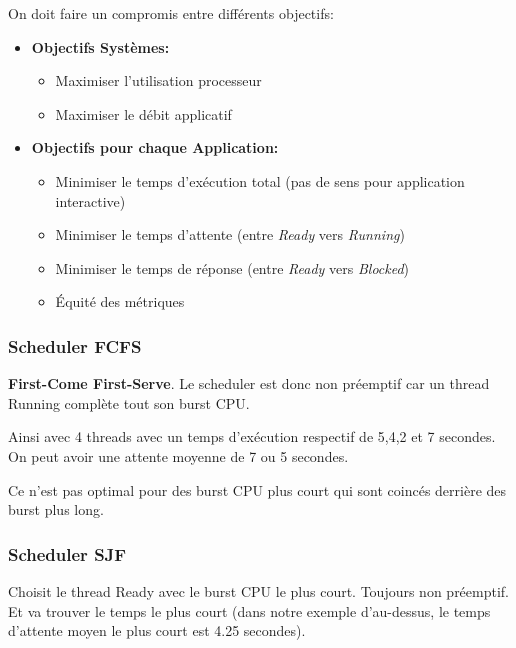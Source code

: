 On doit faire un compromis entre différents objectifs:

\begin{itemize}
\tightlist
\item
  \textbf{Objectifs Systèmes:}

  \begin{itemize}
  \tightlist
  \item
    Maximiser l'utilisation processeur
  \item
    Maximiser le débit applicatif
  \end{itemize}
\item
  \textbf{Objectifs pour chaque Application:}

  \begin{itemize}
  \tightlist
  \item
    Minimiser le temps d'exécution total (pas de sens pour application
    interactive)
  \item
    Minimiser le temps d'attente (entre \emph{Ready} vers
    \emph{Running})
  \item
    Minimiser le temps de réponse (entre \emph{Ready} vers
    \emph{Blocked})
  \item
    Équité des métriques
  \end{itemize}
\end{itemize}

\subsubsection{Scheduler FCFS}\label{scheduler-fcfs}

\textbf{First-Come First-Serve}. Le scheduler est donc non préemptif car
un thread Running complète tout son burst CPU.

Ainsi avec 4 threads avec un temps d'exécution respectif de 5,4,2 et 7
secondes. On peut avoir une attente moyenne de 7 ou 5 secondes.

Ce n'est pas optimal pour des burst CPU plus court qui sont coincés
derrière des burst plus long.

\subsubsection{Scheduler SJF}\label{scheduler-sjf}

Choisit le thread Ready avec le burst CPU le plus court. Toujours non
préemptif. Et va trouver le temps le plus court (dans notre exemple
d'au-dessus, le temps d'attente moyen le plus court est 4.25 secondes).

